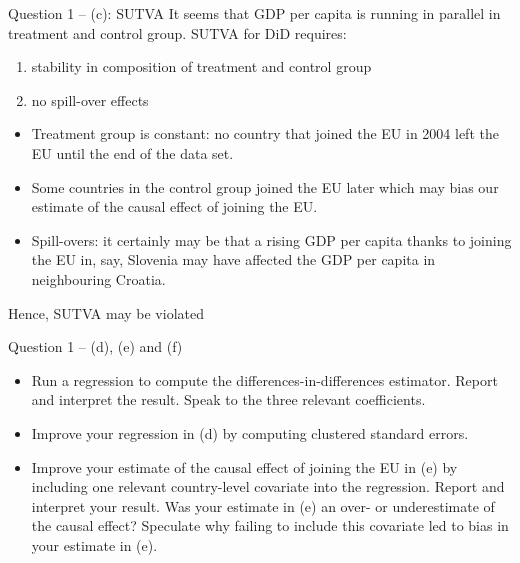 \documentclass[xcolor=table,dvipsnames]{beamer}
\begin{document}
\begin{frame}{Question 1 -- (c): SUTVA}
It seems that GDP per capita is running in parallel in treatment and control group. \pause SUTVA for DiD requires: \pause
\begin{enumerate}
\item stability in composition of treatment and control group \pause
\item no spill-over effects
\end{enumerate} \pause
\begin{itemize}
\item Treatment group is constant: no country that joined the EU in 2004 left the EU until the end of the data set. \pause
\item Some countries in the control group joined the EU later which may bias our estimate of the causal effect of joining the EU. \pause
\item Spill-overs: it certainly may be that a rising GDP per capita thanks to joining the EU in, say, Slovenia may have affected the GDP per capita in neighbouring Croatia. \pause
\end{itemize} 

Hence, SUTVA may be violated
\end{frame}

\begin{frame}{Question 1 -- (d), (e) and (f)}
\begin{itemize}
\item[(d)] Run a regression to compute the differences-in-differences estimator. Report and interpret the result. Speak to the three relevant coefficients.
\item[(e)] Improve your regression in (d) by computing clustered standard errors.
\item[(f)] Improve your estimate of the causal effect of joining the EU in (e) by including one relevant country-level covariate into the regression. Report and interpret your result. Was your estimate in (e) an over- or underestimate of the causal effect? Speculate why failing to include this covariate led to bias in your estimate in (e).
\end{itemize}
\end{frame}
\end{document}
